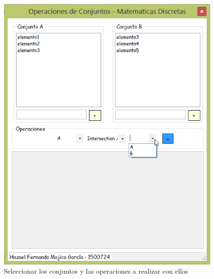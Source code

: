 \begin{figure}[h]
\centering
    \includegraphics[angle = 0]{img/3.png}
    \caption{Seleccionar los conjuntos y las operaciones a realizar con ellos}
	\label{img:3}
\end{figure}

